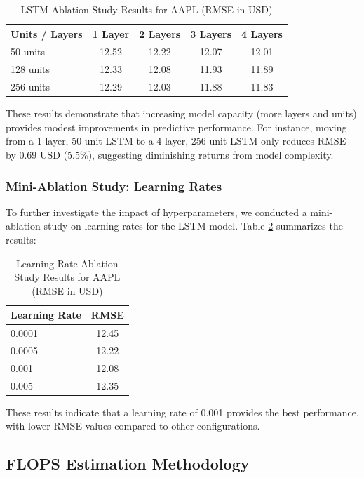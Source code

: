 \documentclass[sigconf]{acmart}
\begin{document}
\begin{table}[h]
\caption{LSTM Ablation Study Results for AAPL (RMSE in USD)}
\label{tab:ablation}
\begin{tabular}{lcccc}
\toprule
\textbf{Units / Layers} & \textbf{1 Layer} & \textbf{2 Layers} & \textbf{3 Layers} & \textbf{4 Layers} \\
\midrule
50 units       & 12.52   & 12.22    & 12.07    & 12.01    \\
128 units      & 12.33   & 12.08    & 11.93    & 11.89    \\
256 units      & 12.29   & 12.03    & 11.88    & 11.83    \\
\bottomrule
\end{tabular}
\end{table}

These results demonstrate that increasing model capacity (more layers and units) provides modest improvements in predictive performance. For instance, moving from a 1-layer, 50-unit LSTM to a 4-layer, 256-unit LSTM only reduces RMSE by 0.69 USD (5.5\%), suggesting diminishing returns from model complexity.

\subsubsection{Mini-Ablation Study: Learning Rates}

To further investigate the impact of hyperparameters, we conducted a mini-ablation study on learning rates for the LSTM model. Table \ref{tab:lr_ablation} summarizes the results:

\begin{table}[h]
\caption{Learning Rate Ablation Study Results for AAPL (RMSE in USD)}
\label{tab:lr_ablation}
\begin{tabular}{lc}
\toprule
\textbf{Learning Rate} & \textbf{RMSE} \\
\midrule
0.0001 & 12.45 \\
0.0005 & 12.22 \\
0.001  & 12.08 \\
0.005  & 12.35 \\
\bottomrule
\end{tabular}
\end{table}

These results indicate that a learning rate of 0.001 provides the best performance, with lower RMSE values compared to other configurations.

\subsection{FLOPS Estimation Methodology}
\end{document}

